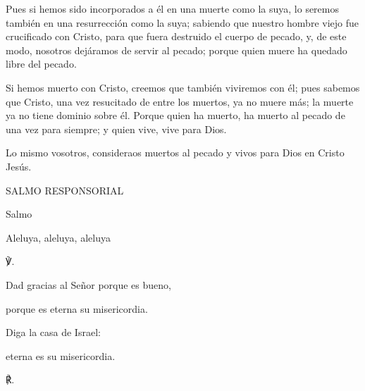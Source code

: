 			\begin{readbody}Pues si hemos sido incorporados a él en una muerte como la suya, lo seremos también en una resurrección como la suya; sabiendo que nuestro hombre viejo fue crucificado con Cristo, para que fuera destruido el cuerpo de pecado, y, de este modo, nosotros dejáramos de servir al pecado; porque quien muere ha quedado libre del pecado. \end{readbody}
			
			\begin{readbody}Si hemos muerto con Cristo, creemos que también viviremos con él; pues sabemos que Cristo, una vez resucitado de entre los muertos, ya no muere más; la muerte ya no tiene dominio sobre él. Porque quien ha muerto, ha muerto al pecado de una vez para siempre; y quien vive, vive para Dios. \end{readbody}
			
			\begin{readbody}Lo mismo vosotros, consideraos muertos al pecado y vivos para Dios en Cristo Jesús.\end{readbody}
			
			\begin{readtitle}SALMO RESPONSORIAL\end{readtitle}
			
			\begin{readbook}Salmo \end{readbook}
			
			\begin{readtheme}Aleluya, aleluya, aleluya\end{readtheme}
			
			\begin{readbody}\begin{readred}℣.\end{readred} Dad gracias al Señor porque es bueno, \end{readbody}
			
			\begin{readtabbed}porque es eterna su misericordia. \end{readtabbed}
			
			\begin{readtabbed}Diga la casa de Israel: \end{readtabbed}
			
			\begin{readtabbed}eterna es su misericordia. \begin{readred}℟.\end{readred}\end{readtabbed}
			
